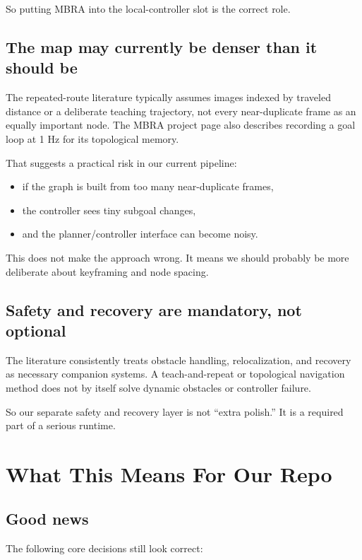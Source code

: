 \documentclass[11pt,a4paper]{article}
\begin{document}
So putting MBRA into the local-controller slot is the correct role.

\subsection{The map may currently be denser than it should be}

The repeated-route literature typically assumes images indexed by traveled
distance or a deliberate teaching trajectory, not every near-duplicate frame as
an equally important node.  The MBRA project page also describes recording a
goal loop at 1 Hz for its topological memory.

That suggests a practical risk in our current pipeline:

\begin{itemize}[nosep]
  \item if the graph is built from too many near-duplicate frames,
  \item the controller sees tiny subgoal changes,
  \item and the planner/controller interface can become noisy.
\end{itemize}

This does not make the approach wrong.  It means we should probably be more
deliberate about keyframing and node spacing.

\subsection{Safety and recovery are mandatory, not optional}

The literature consistently treats obstacle handling, relocalization, and
recovery as necessary companion systems.  A teach-and-repeat or topological
navigation method does not by itself solve dynamic obstacles or controller
failure.

So our separate safety and recovery layer is not ``extra polish.''  It is a
required part of a serious runtime.

\section{What This Means For Our Repo}

\subsection{Good news}

The following core decisions still look correct:
\end{document}
